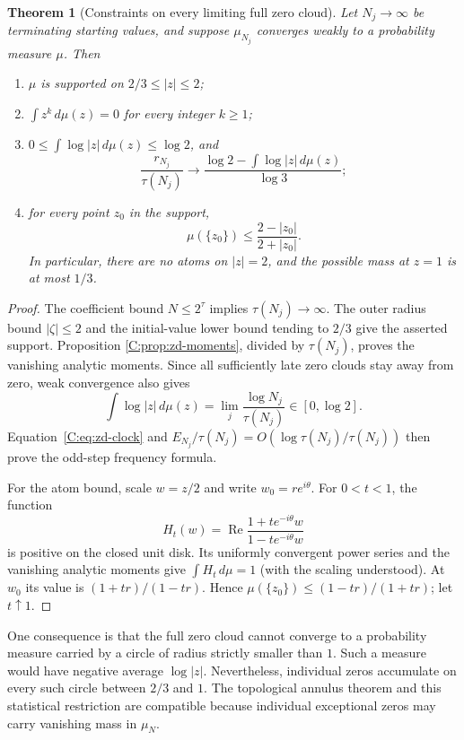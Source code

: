 \documentclass[11pt,a4paper]{article}
\newtheorem{theorem}{Theorem}[section]
\theoremstyle{definition}
\theoremstyle{remark}
\numberwithin{equation}{section}
\begin{document}
\begin{theorem}[Constraints on every limiting full zero cloud]
\label{C:thm:zd-limit-constraints}
Let $N_j\to\infty$ be terminating starting values, and suppose
$\mu_{N_j}$ converges weakly to a probability measure $\mu$.
Then
\begin{enumerate}
\item $\mu$ is supported on $2/3\le|z|\le2$;
\item $\int z^k\,d\mu(z)=0$ for every integer $k\ge1$;
\item $0\le\int\log|z|\,d\mu(z)\le\log2$, and
\[
 \frac{r_{N_j}}{\tau(N_j)}\longrightarrow
 \frac{\log2-\int\log|z|\,d\mu(z)}{\log3};
\]
\item for every point $z_0$ in the support,
\[
 \mu(\{z_0\})\le\frac{2-|z_0|}{2+|z_0|}.
\]
In particular, there are no atoms on $|z|=2$, and the possible mass at
$z=1$ is at most $1/3$.
\end{enumerate}
\end{theorem}
\begin{proof}
The coefficient bound $N\le2^\tau$ implies $\tau(N_j)\to\infty$.
The outer radius bound $|\zeta|\le2$ and the initial-value lower bound
tending to $2/3$ give the asserted support. Proposition
\ref{C:prop:zd-moments}, divided by $\tau(N_j)$, proves the vanishing
analytic moments. Since all sufficiently late zero clouds stay away
from zero, weak convergence also gives
\[
 \int\log|z|\,d\mu(z)
 =\lim_j\frac{\log N_j}{\tau(N_j)}\in[0,\log2].
\]
Equation~\eqref{C:eq:zd-clock} and
$E_{N_j}/\tau(N_j)=O(\log\tau(N_j)/\tau(N_j))$ then prove the
odd-step frequency formula.

For the atom bound, scale $w=z/2$ and write $w_0=re^{i\theta}$.
For $0<t<1$, the function
\[
 H_t(w)=\operatorname{Re}
       \frac{1+te^{-i\theta}w}{1-te^{-i\theta}w}
\]
is positive on the closed unit disk. Its uniformly convergent power
series and the vanishing analytic moments give $\int H_t\,d\mu=1$
(with the scaling understood). At $w_0$ its value is
$(1+tr)/(1-tr)$. Hence
$\mu(\{z_0\})\le(1-tr)/(1+tr)$; let $t\uparrow1$.
\end{proof}

One consequence is that the full zero cloud cannot converge to a
probability measure carried by a circle of radius strictly smaller than
$1$. Such a measure would have negative average $\log|z|$. Nevertheless,
individual zeros accumulate on every such circle between $2/3$ and $1$.
The topological annulus theorem and this statistical restriction are
compatible because individual exceptional zeros may carry vanishing
mass in $\mu_N$.
\end{document}
